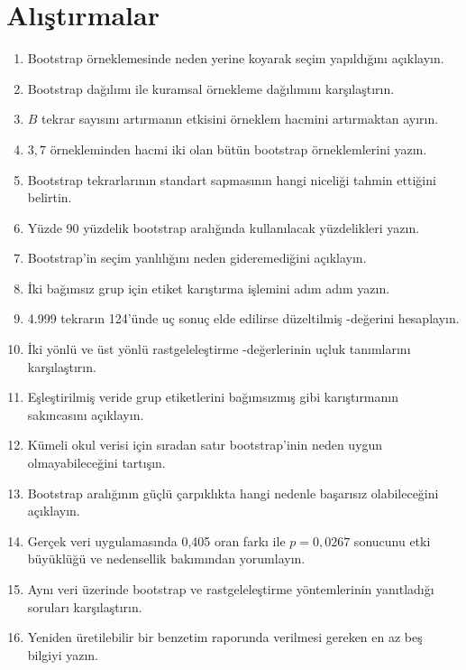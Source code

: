 
\section*{Alıştırmalar}

\begin{enumerate}
  \item Bootstrap örneklemesinde neden yerine koyarak seçim yapıldığını açıklayın.
  \item Bootstrap dağılımı ile kuramsal örnekleme dağılımını karşılaştırın.
  \item $B$ tekrar sayısını artırmanın etkisini örneklem hacmini artırmaktan ayırın.
  \item $3,7$ örnekleminden hacmi iki olan bütün bootstrap örneklemlerini yazın.
  \item Bootstrap tekrarlarının standart sapmasının hangi niceliği tahmin ettiğini belirtin.
  \item Yüzde 90 yüzdelik bootstrap aralığında kullanılacak yüzdelikleri yazın.
  \item Bootstrap'in seçim yanlılığını neden gideremediğini açıklayın.
  \item İki bağımsız grup için etiket karıştırma işlemini adım adım yazın.
  \item 4.999 tekrarın 124'ünde uç sonuç elde edilirse düzeltilmiş \pval-değerini hesaplayın.
  \item İki yönlü ve üst yönlü rastgeleleştirme \pval-değerlerinin uçluk tanımlarını karşılaştırın.
  \item Eşleştirilmiş veride grup etiketlerini bağımsızmış gibi karıştırmanın sakıncasını açıklayın.
  \item Kümeli okul verisi için sıradan satır bootstrap'inin neden uygun olmayabileceğini tartışın.
  \item Bootstrap aralığının güçlü çarpıklıkta hangi nedenle başarısız olabileceğini açıklayın.
  \item Gerçek veri uygulamasında 0,405 oran farkı ile $p=0{,}0267$ sonucunu etki büyüklüğü ve nedensellik bakımından yorumlayın.
  \item Aynı veri üzerinde bootstrap ve rastgeleleştirme yöntemlerinin yanıtladığı soruları karşılaştırın.
  \item Yeniden üretilebilir bir benzetim raporunda verilmesi gereken en az beş bilgiyi yazın.
\end{enumerate}

